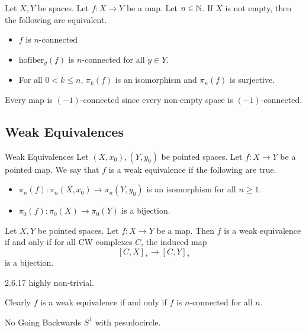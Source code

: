 \documentclass[a4paper]{article}
\begin{document}
\begin{prp}{}{} Let $X,Y$ be spaces. Let $f:X\to Y$ be a map. Let $n\in\mathbb{N}$. If $X$ is not empty, then the following are equivalent. 
\begin{itemize}
\item $f$ is $n$-connected
\item $\text{hofiber}_y(f)$ is $n$-connected for all $y\in Y$. 
\item For all $0<k\leq n$, $\pi_k(f)$ is an isomorphism and $\pi_n(f)$ is surjective. 
\end{itemize}
\end{prp}

Every map is $(-1)$-connected since every non-empty space is $(-1)$-connected. 

\subsection{Weak Equivalences}
\begin{defn}{Weak Equivalences}{} Let $(X,x_0),(Y,y_0)$ be pointed spaces. Let $f:X\to Y$ be a pointed map. We say that $f$ is a weak equivalence if the following are true. 
\begin{itemize}
\item $\pi_n(f):\pi_n(X,x_0)\to\pi_n(Y,y_0)$ is an isomorphism for all $n\geq 1$. 
\item $\pi_0(f):\pi_0(X)\to\pi_0(Y)$ is a bijection. 
\end{itemize}
\end{defn}

\begin{prp}{}{} Let $X,Y$ be pointed spaces. Let $f:X\to Y$ be a map. Then $f$ is a weak equivalence if and only if for all CW complexes $C$, the induced map $$[C,X]_\ast\to[C,Y]_\ast$$ is a bijection. 
\end{prp}

2.6.17 highly non-trivial. 

Clearly $f$ is a weak equivalence if and only if $f$ is $n$-connected for all $n$. 

\begin{eg}{No Going Backwards}{} $S^1$ with pesudocircle. 
\end{eg}
\end{document}
